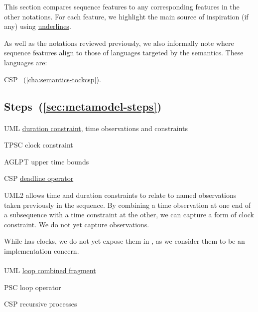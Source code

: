 \newcommand{\insp}[1]{\ul{#1}}

This section compares \langname{} sequence features to any
corresponding features in the other notations.
For each feature, we highlight the main source of inspiration (if any)
using \insp{underlines}.

As well as the notations reviewed previously, we also
informally note where \langname{} sequence features align to those of
languages targeted by the \langname{} semantics.  These languages are:

\begin{featset}
\item[CSP] \tockcsp~(\autoref{cha:semantics-tockcsp}).
\end{featset}

\subsection{Steps~(\ref{sec:metamodel-steps})}

\paragraph{\mdeadlinestep}
\begin{featset}
\item[UML] \insp{duration constraint}, time observations and constraints
\item[TPSC] clock constraint
\item[AGLPT] upper time bounds
\item[CSP] \insp{deadline operator}
\end{featset}

UML2 allows time and duration constraints to relate to named observations taken
previously in the sequence.  By combining a time observation at one end of a
subsequence with a time constraint at the other, we can capture a form of clock
constraint.  We do not yet capture observations.

While \robochart{} has clocks, we do not yet expose them in
\langname, as we consider them to be an implementation concern.
      
\paragraph{\mloopstep}
\begin{featset}
\item[UML] \insp{loop combined fragment}
\item[PSC] loop operator
\item[CSP] recursive processes
\end{featset}

